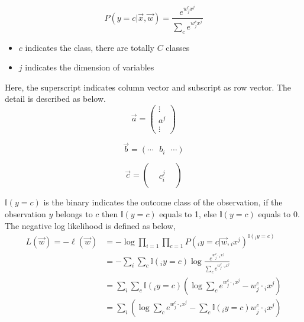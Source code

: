 \documentclass[12pt,a4paper]{article}%
\theoremstyle{definition}
\theoremstyle{plain}
\numberwithin{equation}{section}
\begin{document}
\begin{equation*}
P(y = c| \vec{x} ,\vec{w}) = \frac{e^{w^{c}_{j} x^{j}}} { \sum\limits_{c} e^{ w^{c}_{j} x^{j} } }
\end{equation*}

\begin{itemize}
\item $c$ indicates the class, there are totally $C$ classes
\item $j$ indicates the dimension of variables
\end{itemize}

Here, the superscript indicates column vector and subscript as row vector. The detail is described as below.
\begin{equation}
\vec{a} = \begin{pmatrix}
 \vdots \\
  a^{j}  \\
 \vdots
\end{pmatrix}
\end{equation} 

\begin{equation}
\vec{b} =  ( \cdots ~~~ b_{i} ~~~\cdots )  
\end{equation} 
				
\begin{equation}
\vec{c} = \begin{pmatrix}
  &  &  \\
 &  c_{i}^{j} &   \\
 &   &
\end{pmatrix}
\end{equation} 

$\mathbb{I}(y=c)$ is the binary indicates the outcome class of the observation, if the observation $y$ belongs to $c$ then $\mathbb{I}(y=c)$ equals to 1, else $\mathbb{I}(y=c)$ equals to 0.
The negative log likelihood is defined as below, 
\begin{align*}
L(\vec{w}) = -\ell(\vec{w}) &= - \log \prod\limits_{i=1} \prod\limits_{c=1}  P( {}_iy = c | \vec{w}, {}_ix^{j} )^{\mathbb{I}({}_iy = c)} \\
										  &= - \sum\limits_{i} \sum\limits_{c}  \mathbb{I}({}_iy = c) \log \frac{e^{ w^{c}_{j} \cdot {}_ix^{j} }} { \sum\limits_{c} e^{ w^{c}_{j} \cdot {}_ix^{j} } } \\
										  &= \sum\limits_{i} \sum\limits_{c} \mathbb{I}({}_iy = c) ( \log \sum\limits_{c} e^{ w^{c}_{j} \cdot {}_ix^{j} } - w^{c}_{j} \cdot {}_ix^{j}  ) \\
										  &= \sum\limits_{i} ( \log \sum\limits_{c} e^{ w^{c}_{j} \cdot {}_ix^{j} } - \sum\limits_{c} \mathbb{I}({}_iy = c)  w^{c}_{j} \cdot {}_ix^{j}  )
\end{align*}
\end{document}
